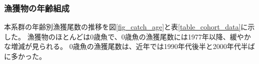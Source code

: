 \subsubsection{漁獲物の年齢組成}
本系群の年齢別漁獲尾数の推移を図\ref{fig_catch_age}と表\ref{table_cohort_data}に示した。
漁獲物のほとんどは0歳魚で、0歳魚の漁獲尾数には1977年以降、緩やかな増減が見られる。
0歳魚の漁獲尾数は、近年では1990年代後半と2000年代半ばに多かった。
